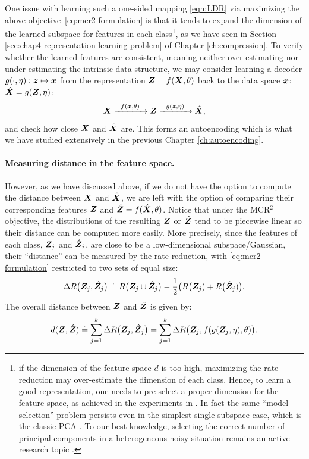 \documentclass[../../book-main.tex]{subfiles}
\begin{document}
{One issue with learning such a one-sided  mapping \eqref{eqn:LDR} via  maximizing the above \mbox{objective \eqref{eq:mcr2-formulation}} is that it tends to expand the dimension of the learned subspace for features in each class\footnote{if the dimension of the feature space $d$ is too high, maximizing the rate reduction may over-estimate the dimension of each class. Hence, to learn a good representation, one needs to pre-select a proper dimension for the feature space, as achieved in the experiments in \cite{yu2020learning}. In fact the same ``model selection'' problem persists even in the simplest single-subspace case, which is the classic PCA \cite{Jolliffe1986}. To our best knowledge, selecting the correct number of principal components in a heterogeneous noisy situation remains an active research topic \cite{hong2020selecting}.}, as we have seen in Section \ref{sec:chap4-representation-learning-problem} of Chapter \ref{ch:compression}. To verify whether the learned features are consistent, meaning neither over-estimating nor under-estimating the intrinsic data structure, we may consider learning a decoder $g(\cdot,\eta): \bm{z} \mapsto  \bm{x}$ from the representation $\bm{Z} = f(\bm{X},\theta)$ back to the data space $\bm{x}$: $\hat {\bm{X}} = g(\bm{Z}, \eta)$:
\begin{equation}
    \bm{X} \xrightarrow{\hspace{2mm} f(\bm{x}, \theta)\hspace{2mm}} \bm{Z} \xrightarrow{\hspace{2mm} g(\bm{z},\eta) \hspace{2mm}} \hat {\bm{X}}, 
    \label{eqn:autoencoding-ch6}
\end{equation}
and check how close $\bm{X}$ and $\hat {\bm{X}}$ are. This forms an autoencoding which is  what we have studied extensively in the previous Chapter \ref{ch:autoencoding}.

\paragraph{Measuring distance in the feature space.}
However, as we have discussed above, if we do not have the option to compute the distance between $\bm{X}$ and $\hat {\bm{X}}$, we are left with the option of comparing their corresponding features $\bm{Z}$ and $\hat {\bm{Z}} = f(\hat {\bm{X}}, \theta)$. Notice that under the MCR$^2$ objective, the distributions of the resulting $\bm{Z}$ or $\hat {\bm{Z}}$ tend to be piecewise linear so  their distance can be  computed more easily. More precisely, since the features of each class, $\bm{Z}_j$ and $\hat{\bm{Z}}_j$, are close to be a low-dimensional subspace/Gaussian, their ``distance'' can be measured by the rate reduction, {with \eqref{eq:mcr2-formulation} restricted to two sets of equal size}:
\begin{equation}
\Delta R\big(\bm{Z}_j, \hat{\bm{Z}}_j\big) \doteq R\big(\bm{Z}_j \cup \hat{\bm{Z}}_j\big) - \frac{1}{2} \big( R\big(\bm{Z}_j) + R\big(\hat {\bm{Z}}_j)\big).
\end{equation}
The overall distance between $\bm{Z}$ and $\hat {\bm{Z}}$ is given by:
\begin{equation}
d(\bm{Z}, \hat {\bm{Z}}) \doteq   \sum_{j=1}^k \Delta R\big(\bm{Z}_j, \hat{\bm{Z}}_j\big) =  \sum_{j=1}^k \Delta R\big(\bm{Z}_j, f(g(\bm{Z}_j, \eta),\theta)\big).
\label{eqn:Z-distance}
\end{equation}


}
\end{document}
